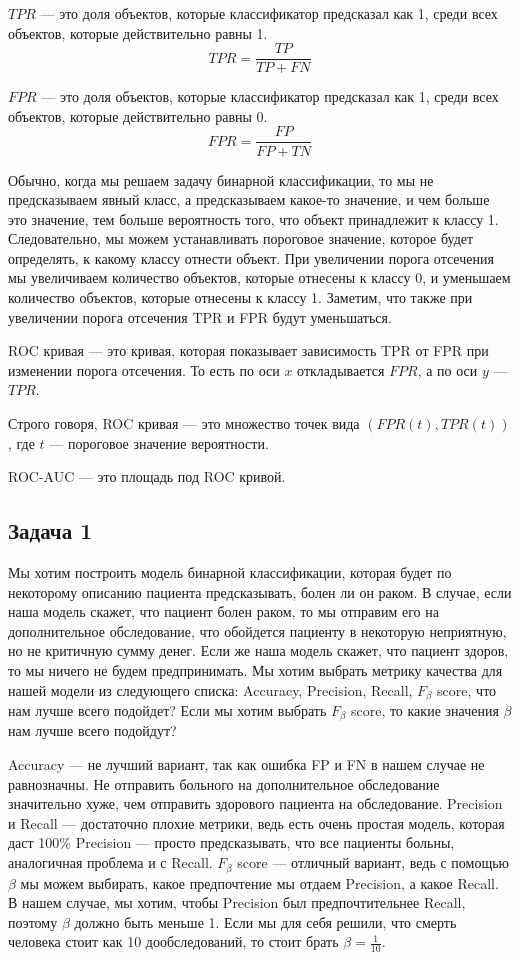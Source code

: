 $TPR$ --- это доля объектов, которые классификатор предсказал как 1, среди всех объектов, которые действительно равны 1.
$$
    TPR = \frac{TP}{TP + FN}
$$

$FPR$ --- это доля объектов, которые классификатор предсказал как 1, среди всех объектов, которые действительно равны 0.
$$
    FPR = \frac{FP}{FP + TN}
$$

Обычно, когда мы решаем задачу бинарной классификации, то мы не предсказываем явный класс, а предсказываем какое-то значение, и чем больше это значение, тем больше вероятность того, что объект принадлежит к классу 1.
Следовательно, мы можем устанавливать пороговое значение, которое будет определять, к какому классу отнести объект.
При увеличении порога отсечения мы увеличиваем количество объектов, которые отнесены к классу 0, и уменьшаем количество объектов, которые отнесены к классу 1.
Заметим, что также при увеличении порога отсечения TPR и FPR будут уменьшаться.

ROC кривая --- это кривая, которая показывает зависимость TPR от FPR при изменении порога отсечения. То есть по оси $x$ откладывается $FPR$, а по оси $y$ --- $TPR$.

Строго говоря, ROC кривая --- это множество точек вида $(FPR(t), TPR(t))$, где $t$ --- пороговое значение вероятности.

ROC-AUC --- это площадь под ROC кривой.

\subsection*{Задача 1}

Мы хотим построить модель бинарной классификации, которая будет по некоторому описанию пациента предсказывать, болен ли он раком.
В случае, если наша модель скажет, что пациент болен раком, то мы отправим его на дополнительное обследование, что обойдется пациенту в некоторую неприятную, но не критичную сумму денег.
Если же наша модель скажет, что пациент здоров, то мы ничего не будем предпринимать.
Мы хотим выбрать метрику качества для нашей модели из следующего списка: Accuracy, Precision, Recall, $F_{\beta}$ score, что нам лучше всего подойдет?
Если мы хотим выбрать $F_{\beta}$ score, то какие значения $\beta$ нам лучше всего подойдут?

\begin{solution}
Accuracy --- не лучший вариант, так как ошибка FP и FN в нашем случае не равнозначны.
Не отправить больного на дополнительное обследование значительно хуже, чем отправить здорового пациента на обследование.
Precision и Recall --- достаточно плохие метрики, ведь есть очень простая модель, которая даст 100\% Precision --- просто предсказывать, что все пациенты больны, аналогичная проблема и с Recall.
$F_{\beta}$ score --- отличный вариант, ведь с помощью $\beta$ мы можем выбирать, какое предпочтение мы отдаем Precision, а какое Recall.
В нашем случае, мы хотим, чтобы Precision был предпочтительнее Recall, поэтому $\beta$ должно быть меньше 1.
Если мы для себя решили, что смерть человека стоит как 10 дообследований, то стоит брать $\beta = \frac{1}{10}$.
\end{solution}
